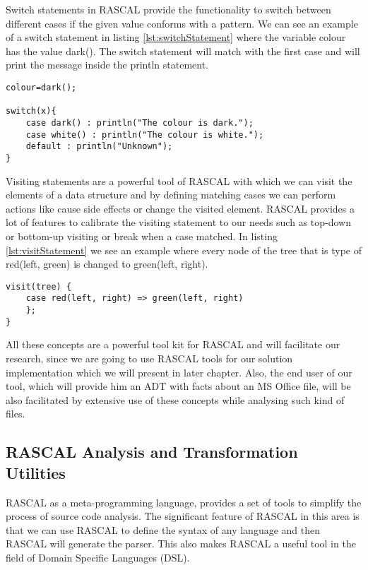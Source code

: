 Switch statements in RASCAL provide the functionality to switch between different cases if the given value conforms with a pattern. We can see an example of a switch statement in listing \ref{lst:switchStatement} where the variable colour has the value dark(). The switch statement will match with the first case and will print the message inside the println statement. 
\begin{lstlisting}[caption={Switch statement in RASCAL},label={lst:switchStatement}]
colour=dark();

switch(x){
	case dark() : println("The colour is dark.");
	case white() : println("The colour is white.");
	default : println("Unknown");
}
\end{lstlisting}
Visiting statements are a powerful tool of RASCAL with which we can visit the elements of a data structure and by defining matching cases we can perform actions like cause side effects or change the visited element. RASCAL provides a lot of features to calibrate the visiting statement to our needs such as top-down or bottom-up visiting or break when a case matched. In listing \ref{lst:visitStatement} we see an example where every node of the tree that is type of red(left, green) is changed to green(left, right).




\begin{lstlisting}[caption={Visit statement with action to change the matching case},label={lst:visitStatement}]
visit(tree) {
	case red(left, right) => green(left, right)
	};
}	
\end{lstlisting}

All these concepts are a powerful tool kit for RASCAL and will facilitate our research, since we are going to use RASCAL tools for our solution implementation which we will present in later chapter. Also, the end user of our tool, which will provide him an ADT with facts about an MS Office file, will be also facilitated by extensive use of these concepts while analysing such kind of files.

\subsection{RASCAL Analysis and Transformation Utilities }
RASCAL as a meta-programming language, provides a set of tools to simplify the process of source code analysis. The significant feature of RASCAL in this area is that we can use RASCAL to define the syntax of any language and then RASCAL will generate the parser. This also makes RASCAL a useful tool in the field of Domain Specific Languages (DSL).

